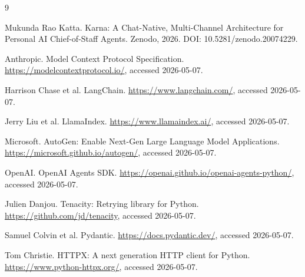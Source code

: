 \documentclass[sigconf,review]{acmart}
\begin{document}
\begin{thebibliography}{9}

Mukunda Rao Katta.
\newblock Karna: A Chat-Native, Multi-Channel Architecture for Personal AI Chief-of-Staff Agents.
\newblock Zenodo, 2026. DOI: 10.5281/zenodo.20074229.

Anthropic.
\newblock Model Context Protocol Specification.
\newblock \url{https://modelcontextprotocol.io/}, accessed 2026-05-07.

Harrison Chase et al.
\newblock LangChain.
\newblock \url{https://www.langchain.com/}, accessed 2026-05-07.

Jerry Liu et al.
\newblock LlamaIndex.
\newblock \url{https://www.llamaindex.ai/}, accessed 2026-05-07.

Microsoft.
\newblock AutoGen: Enable Next-Gen Large Language Model Applications.
\newblock \url{https://microsoft.github.io/autogen/}, accessed 2026-05-07.

OpenAI.
\newblock OpenAI Agents SDK.
\newblock \url{https://openai.github.io/openai-agents-python/}, accessed 2026-05-07.

Julien Danjou.
\newblock Tenacity: Retrying library for Python.
\newblock \url{https://github.com/jd/tenacity}, accessed 2026-05-07.

Samuel Colvin et al.
\newblock Pydantic.
\newblock \url{https://docs.pydantic.dev/}, accessed 2026-05-07.

Tom Christie.
\newblock HTTPX: A next generation HTTP client for Python.
\newblock \url{https://www.python-httpx.org/}, accessed 2026-05-07.

\end{thebibliography}
\end{document}
